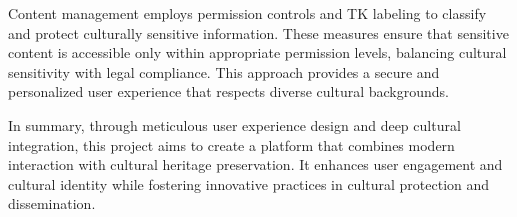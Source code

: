 Content management employs permission controls and TK labeling to classify and protect culturally sensitive information. These measures ensure that sensitive content is accessible only within appropriate permission levels, balancing cultural sensitivity with legal compliance. This approach provides a secure and personalized user experience that respects diverse cultural backgrounds.

In summary, through meticulous user experience design and deep cultural integration, this project aims to create a platform that combines modern interaction with cultural heritage preservation. It enhances user engagement and cultural identity while fostering innovative practices in cultural protection and dissemination.